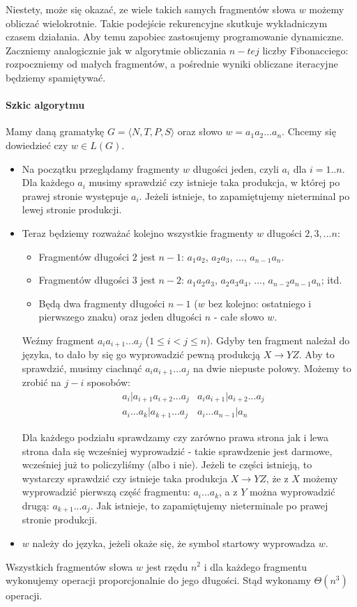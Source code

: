 Niestety, może się okazać, ze wiele takich samych fragmentów słowa $w$ możemy obliczać wielokrotnie.
Takie podejście rekurencyjne skutkuje wykładniczym czasem działania.
Aby temu zapobiec zastosujemy programowanie dynamiczne. 
Zaczniemy analogicznie jak w algorytmie obliczania $n-tej$ liczby Fibonacciego: rozpoczniemy od małych fragmentów, a pośrednie wyniki obliczane iteracyjne będziemy spamiętywać.

\paragraph{Szkic algorytmu} Mamy daną gramatykę  $G = \langle N, T, P, S \rangle$ oraz słowo $w = a_1a_2...a_n$. Chcemy się dowiedzieć czy $w \in L(G)$.
\begin{itemize}
\item Na początku przeglądamy fragmenty $w$ długości jeden, czyli $a_i$ dla $i=1..n$.
Dla każdego $a_i$ musimy sprawdzić czy istnieje taka produkcja, w której po prawej stronie występuje $a_i$. Jeżeli istnieje, to zapamiętujemy nieterminal po lewej stronie produkcji.
\item Teraz będziemy rozważać kolejno wszystkie fragmenty $w$ długości $2,3,...n$:
	\begin{itemize}
		\item Fragmentów długości $2$ jest $n-1$: $a_1a_2$, $a_2a_3$, ..., $a_{n-1}a_n$. 
        \item Fragmentów długości $3$ jest $n-2$: $a_1a_2a_3$, $a_2a_3a_4$, ..., $a_{n-2}a_{n-1}a_n$; itd.
 		\item Będą dwa fragmenty długości $n-1$ ($w$ bez kolejno: ostatniego i pierwszego znaku) oraz jeden długości $n$ - całe słowo $w$.
	\end{itemize}

Weźmy fragment $a_ia_{i+1}...a_j$ ($1 \leq i < j \leq n$).
Gdyby ten fragment należał do języka, to dało by się go wyprowadzić pewną produkcją $X \rightarrow YZ$.
Aby to sprawdzić, musimy ciachnąć $a_ia_{i+1}...a_j$ na dwie niepuste połowy.
Możemy to zrobić na $j-i$ sposobów:
\begin{align*}
&a_i|a_{i+1}a_{i+2}...a_j  &a_ia_{i+1}|a_{i+2}...a_j \\ &a_i...a_k|a_{k+1}...a_j &a_i...a_{n-1}|a_n
\end{align*}

Dla każdego podziału sprawdzamy czy zarówno prawa strona jak i lewa strona dała się wcześniej wyprowadzić - takie sprawdzenie jest darmowe, wcześniej już to policzyliśmy (albo i nie).
Jeżeli te części istnieją, to wystarczy sprawdzić czy istnieje taka produkcja $X \rightarrow YZ$, że z $X$ możemy wyprowadzić pierwszą część fragmentu: $a_i...a_k$, a z $Y$ można wyprowadzić drugą: $a_{k+1}...a_j$. Jak istnieje, to zapamiętujemy nieterminale po prawej stronie produkcji.
\item $w$ należy do języka, jeżeli okaże się, że symbol startowy wyprowadza $w$.

\end{itemize}
Wszystkich fragmentów słowa $w$ jest rzędu $n^2$ i dla każdego fragmentu wykonujemy operacji proporcjonalnie do jego długości. Stąd wykonamy $\Theta(n^3)$ operacji.

